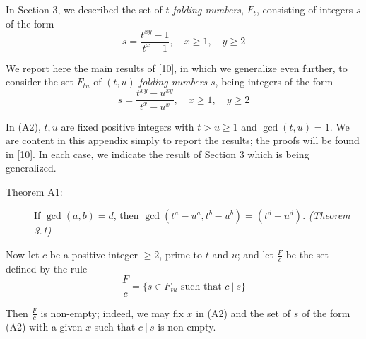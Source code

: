 In Section 3, we described the set of \emph{$t$-folding numbers}, $F_{t}$, consisting of integers $s$ of the form
\begin{equation}
s = \frac{t^{xy}-1}{t^{x}-1}, \quad x \geq 1, \quad y \geq 2  \tag{A1}
\end{equation}

We report here the main results of [10], in which we generalize even further, to consider the set $F_{tu}$ of \emph{$(t,u)$-folding numbers} $s$, being integers of the form
\begin{equation}
s = \frac{t^{xy}-u^{xy}}{t^{x}-u^{x}}, \quad x \geq 1, \quad y \geq 2  \tag{A2}
\end{equation}

In (A2), $t,u$ are fixed positive integers with $t > u \geq 1$ and $\gcd(t,u) = 1$. We are content in this appendix simply to report the results; the proofs will be found in [10]. In each case, we indicate the result of Section 3 which is being generalized.

\begin{description}

  \item[Theorem A1:] If $\gcd(a,b) = d$, then $\gcd (t^{a}-u^{a}, t^{b}-u^{b}) = (t^{d}-u^{d})$. \emph{(Theorem 3.1)}

\end{description}

Now let $c$ be a positive integer $\geq 2$, prime to $t$ and $u$; and let $\frac{F}{c}$ be the set defined by the rule
\begin{equation*}
\frac{F}{c} = \{ s \in F_{tu} \text{ such that } c\ |\ s \}
\end{equation*}

Then $\frac{F}{c}$ is non-empty; indeed, we may fix $x$ in (A2) and the set of $s$ of the form (A2) with a given $x$ such that $c\ |\ s$ is non-empty.

